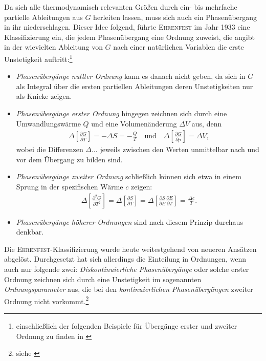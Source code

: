 \documentclass[a4paper, 10pt, twoside, openany]{book} %
\newcommand \bracks[1]{\left [ #1 \right ]}
\newcommand \pdiff[2]{\frac{\partial #1}{\partial #2}}
\begin{document}
Da sich alle thermodynamisch relevanten Größen durch ein- bis mehrfache partielle Ableitungen aus $G$ herleiten lassen, muss sich auch ein Phasenübergang in ihr niederschlagen. Dieser Idee folgend, führte \textsc{Ehrenfest} im Jahr 1933 eine Klassifizierung ein, die jedem Phasenübergang eine Ordnung zuweist, die angibt in der wievielten Ableitung von $G$ nach einer natürlichen Variablen die erste Unstetigkeit auftritt:\footnote{einschließlich der folgenden Beispiele für Übergänge erster und zweiter Ordnung zu finden in \cite[S.~155]{Ehrenfest2}}
%
\begin{itemize}
    \item[] \emph{Phasenübergänge nullter Ordnung} kann es danach nicht geben, da sich in $G$ als Integral über die ersten partiellen Ableitungen deren Unstetigkeiten nur als Knicke zeigen.

    \item[] \emph{Phasenübergänge erster Ordnung} hingegen zeichnen sich durch eine Umwandlungswärme $Q$ und eine Volumenänderung $\Delta V$ aus, denn
    \begin{align*}
        \Delta \bracks{\pdiff G T} = -\Delta S = -\frac Q T \quad \text{und} \quad \Delta \bracks{\pdiff G p} = \Delta V,
    \end{align*}
    wobei die Differenzen $\Delta \dots$ jeweils zwischen den Werten unmittelbar nach und vor dem Übergang zu bilden sind.

    \item[] \emph{Phasenübergänge zweiter Ordnung} schließlich können sich etwa in einem Sprung in der spezifischen Wärme $c$ zeigen:
    \begin{align*}
        \Delta \bracks{\pdiff{^2G}{T^2}} = \Delta \bracks{\pdiff S T} = \Delta \bracks{\pdiff S E \pdiff E T} = \frac {\Delta c} T.
    \end{align*}
    \item[] \emph{Phasenübergänge höherer Ordnungen} sind nach diesem Prinzip durchaus denkbar.
\end{itemize}
%
Die \textsc{Ehrenfest}-Klassifizierung wurde heute weitestgehend von neueren Ansätzen abgelöst. Durchgesetzt hat sich allerdings die Einteilung in Ordnungen, wenn auch nur folgende zwei: \emph{Diskontinuierliche Phasenübergänge} oder solche erster Ordnung zeichnen sich durch eine Unstetigkeit im sogenannten \emph{Ordnungsparameter} aus, die bei den \emph{kontinuierlichen Phasenübergängen} zweiter Ordnung nicht vorkommt.\footnote{siehe \cite[S.~315]{Fliessbach}}
\end{document}
